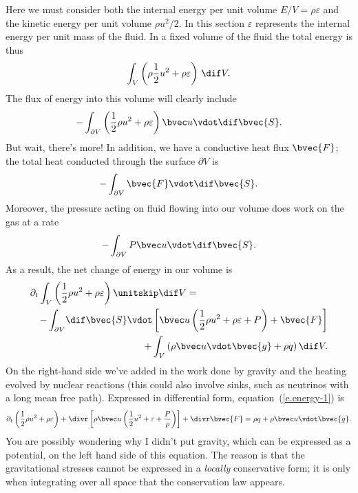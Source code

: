  Here we must consider both the internal energy per unit volume $E/V = \rho \varepsilon$ and the kinetic energy per unit volume $\rho u^{2}/2$.  In this section $\varepsilon$ represents the internal energy per unit mass of the fluid. In a fixed volume of the fluid the total energy is thus
\[ \int_{V} \left(\rho \frac{1}{2}u^{2} + \rho \varepsilon \right)\,\dif V. \]
The flux of energy into this volume will clearly include
\[ -\int_{\partial V}\left(\frac{1}{2}\rho u^{2} + \rho \varepsilon\right) \vu\vdot\dif\bvec{S}. \]
But wait, there's more!  In addition, we have a conductive heat flux $\bvec{F}$; the total heat conducted through the surface $\partial V$ is
\[-\int_{\partial V}\bvec{F}\vdot\dif\bvec{S}.\]
Moreover, the pressure acting on fluid flowing into our volume does work on the gas at a rate
\[-\int_{\partial V}P\vu\vdot\dif\bvec{S}.\]
As a result, the net change of energy in our volume is
\begin{eqnarray}
\lefteqn{\partial_{t}\int_{V}\left(\frac{1}{2}\rho u^{2} + \rho \varepsilon\right)\nsp\dif V = }\nonumber \\
 && -\int_{\partial V} \!\dif\bvec{S}\vdot\left[\vu\left(\frac{1}{2}\rho u^{2} + \rho \varepsilon + P\right) + \bvec{F}\right] \nonumber\\
 &&+ \int_{V} \left( \rho \vu\vdot\bvec{g} + \rho q\right)\dif V.
\label{e.energy-1}
\end{eqnarray}
On the right-hand side we've added in the work done by gravity and the heating evolved by nuclear reactions (this could also involve sinks, such as neutrinos with a long mean free path).
Expressed in differential form, equation~(\ref{e.energy-1}) is
\begin{equation}\label{e.energy-2}
 \partial_{t}\left(\frac{1}{2}\rho u^{2} + \rho \varepsilon\right)
 	+ \divr\left[\rho\vu\left(\frac{1}{2} u^{2} + \varepsilon + \frac{P}{\rho}\right)\right]
	+ \divr\bvec{F} = \rho q + \rho \vu\vdot\bvec{g}.
\end{equation}
You are possibly wondering why I didn't put gravity, which can be expressed as a potential, on the left hand side of this equation.  The reason is that the gravitational stresses cannot be expressed in a  \emph{locally} conservative form; it is only when integrating over all space that the conservation law appears.


